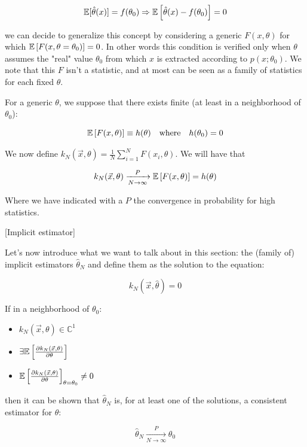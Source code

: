 	\[
	\mathbb{E}[\hat\theta(x)]  = f(\theta_0) \Rightarrow \mathbb{E}\left[\hat\theta(x)-f(\theta_0)\right] = 0
	\]

we can decide to generalize this concept by considering a generic $F(x,\theta)$ for which $\mathbb{E}\left[F(x,\theta=\theta_0)\right]=0$. In other words this condition is verified only when $\theta$ assumes the "real" value $\theta_0$ from which $x$ is extracted according to $p(x;\theta_0)$. We note that this $F$ isn't a statistic, and at most can be seen as a family of statistics for each fixed $\theta$. 

For a generic $\theta$, we suppose that there exists finite (at least in a neighborhood of $\theta_0$):

	\[
	\mathbb{E}\left[F(x,\theta)\right]\equiv h(\theta)\quad \text{where}\quad h(\theta_0)=0
	\]

We now define $k_N(\vec{x},\theta) = \frac{1}{N}\sum_{i=1}^N F(x_i,\theta)$. We will have that

	\[
	k_N(\vec{x},\theta) \xrightarrow[N \to \infty]{P} \mathbb{E}\left[F(x,\theta)\right] = h(\theta)
	\]

Where we have indicated with a $P$ the convergence in probability for high statistics. 


\begin{definition}\label{def:implicit_estimator}[Implicit estimator]
	
	Let's now introduce what we want to talk about in this section: the (family of) implicit estimators $\hat\theta_N$ and define them as the solution to the equation: 
	
	\[
	k_N(\vec{x}, \hat\theta) = 0
	\]
	
 	If in a neighborhood of $\theta_0$:
 	
 	\begin{itemize}
 		\item $k_N(\vec{x},\theta)\in\mathbb{C}^1$
 		\item $\exists\mathbb{E}\left[\frac{\partial k_N(\vec{x},\theta)}{\partial \theta}\right]$
 		\item $\mathbb{E}\left[\frac{\partial k_N(\vec{x},\theta)}{\partial\theta}\right]_{\theta=\theta_0}\neq 0$
 	\end{itemize}
 	
 	then it can be shown that $\hat\theta_N$ is, for at least one of the solutions, a consistent estimator for $\theta$:
 	
	 	\[
	 	\hat\theta_N \xrightarrow[N \to \infty]{P} \theta_0
	 	\]
	 	
\end{definition}

